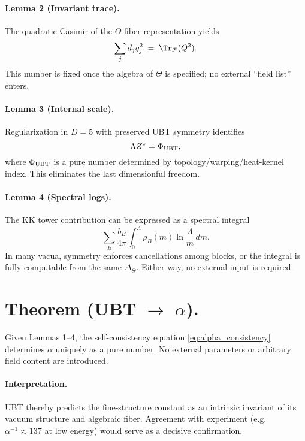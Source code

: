 \documentclass[12pt]{article}
\begin{document}
\paragraph{Lemma 2 (Invariant trace).}
The quadratic Casimir of the $\Theta$-fiber representation yields
\begin{equation}
\sum_j d_j q_j^2 \;=\; \Tr_{\mathcal F}(Q^2).
\end{equation}
This number is fixed once the algebra of $\Theta$ is specified; no external ``field list'' enters.

\paragraph{Lemma 3 (Internal scale).}
Regularization in $D=5$ with preserved UBT symmetry identifies
\begin{equation}
\Lambda Z^\star = \Phi_{\rm UBT},
\end{equation}
where $\Phi_{\rm UBT}$ is a pure number determined by topology/warping/heat-kernel index. This eliminates the last dimensionful freedom.

\paragraph{Lemma 4 (Spectral logs).}
The KK tower contribution can be expressed as a spectral integral
\begin{equation}
\sum_B \frac{b_B}{4\pi}\!\int_0^{\Lambda}\rho_B(m)\ln\!\frac{\Lambda}{m}\,dm.
\end{equation}
In many vacua, symmetry enforces cancellations among blocks, or the integral is fully computable from the same $\Delta_\Theta$. Either way, no external input is required.

\section*{Theorem (UBT $\to$ $\alpha$).}
Given Lemmas 1--4, the self-consistency equation \eqref{eq:alpha_consistency} determines $\alpha$ uniquely as a pure number.
No external parameters or arbitrary field content are introduced.

\paragraph{Interpretation.}
UBT thereby predicts the fine-structure constant as an intrinsic invariant of its vacuum structure and algebraic fiber. 
Agreement with experiment (e.g.\ $\alpha^{-1}\approx137$ at low energy) would serve as a decisive confirmation.
\end{document}
